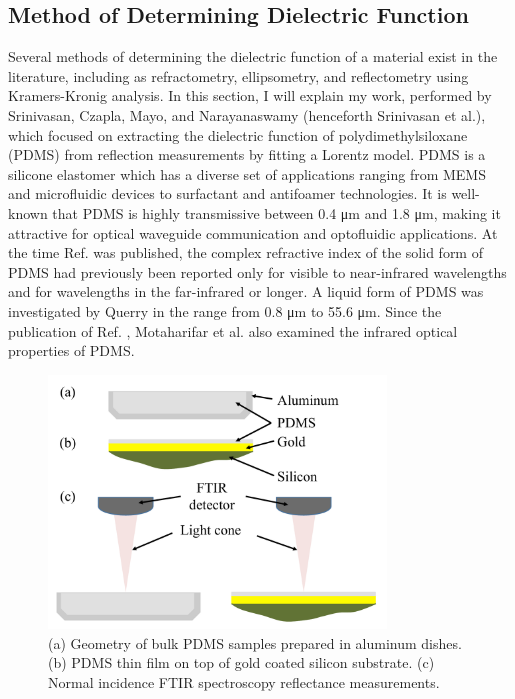 \subsection{Method of Determining Dielectric Function}
%
Several methods of determining the dielectric function of a material exist in the literature, including as refractometry,\cite{Burnett2016} ellipsometry,\cite{Jellison1993} and reflectometry using Kramers-Kronig analysis.\cite{Roessler1965, Roessler1965a} In this section, I will explain my work, performed by Srinivasan, Czapla, Mayo, and Narayanaswamy (henceforth Srinivasan et al.), which focused on extracting the dielectric function of polydimethylsiloxane (PDMS) from reflection measurements by fitting a Lorentz model.\cite{Srinivasan2016} PDMS is a silicone elastomer which has a diverse set of applications ranging from MEMS\cite{Streque2010} and microfluidic devices\cite{Fujii2002, Lamberti2015, You2015} to surfactant\cite{Laubie2013} and antifoamer technologies.\cite{Owen2012}  It is well-known that PDMS is highly transmissive between 0.4 \si{\micro\meter} and 1.8 \si{\micro\meter}, making it attractive for optical waveguide communication and optofluidic applications.\cite{Mata2005, Psaltis2006, Cai2008, Cai2010, Cai2013} At the time Ref.  was published, the complex refractive index of the solid form of PDMS had previously been reported only for visible to near-infrared wavelengths\cite{Spaeth1997, Cardenas-Valencia2006, Kopetz2007, Schneider2009, Cai2010, Cai2013, Kacik2014} and for wavelengths in the far-infrared or longer.\cite{Podzorov2008, Wang2012a, Khodasevych2012, Headland2015} A liquid form of PDMS was investigated by Querry in the range from 0.8 \si{\micro\meter} to 55.6 \si{\micro\meter}.\cite{Querry1987} Since the publication of Ref. , Motaharifar et al. also examined the infrared optical properties of PDMS.\cite{Motaharifar2018}

\begin{figure}
\centering
\includegraphics[width=0.8\textwidth]{./Figures/PDMS_Geometry.pdf}
\caption{\label{fig:PDMS_Geometry}(a) Geometry of bulk PDMS samples prepared in aluminum dishes. (b) PDMS thin film on top of gold coated silicon substrate. (c) Normal incidence FTIR spectroscopy reflectance measurements.}
\end{figure}

